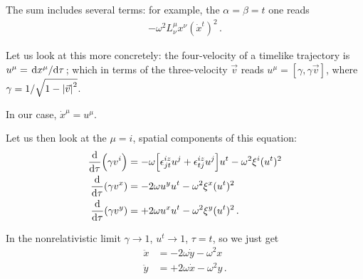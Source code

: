 \documentclass[main.tex]{subfiles}
\begin{document}
\begin{extracontent}
The sum includes several terms: for example, the \(\alpha = \beta = t\) one reads 
%
\begin{align}
- \omega^2 L^{\mu }_{\nu } x^{\nu } (\dot{x}^{t} )^2
\,.
\end{align}

Let us look at this more concretely: the four-velocity of a timelike trajectory is \(u^{\mu } = \dv*{x^{\mu }}{\tau }\); which in terms of the three-velocity \(\vec{v}\) reads \(u^{\mu } = [\gamma , \gamma \vec{v}]\), where \(\gamma = 1 / \sqrt{1 - \abs{\vec{v}}^2}\). 

In our case, \(\dot{x}^{\mu } = u^{\mu }\). 

Let us then look at the \(\mu = i\), spatial components of this equation: 
%
\begin{align}
\dv{}{\tau } \qty(\gamma v^{i}) &=
- \omega \qty[
    \epsilon^{iz}_{jt} u^{j}
    + \epsilon^{iz}_{tj} u^{j}
    ] u^{t} 
- \omega^2 \xi^{i}
(u^{t})^2  \\
\dv{}{\tau } \qty(\gamma v^{x} ) &= - 2\omega u^{y} u^{t} - \omega^2 \xi^{x} (u^{t})^2 \\
\dv{}{\tau } \qty(\gamma v^{y} ) &= + 2\omega u^{x} u^{t} - \omega^2 \xi^{y} (u^{t})^2 
\,.
\end{align}


In the nonrelativistic limit \(\gamma \to 1\), \(u^{t} \to 1\), \(\tau = t\), so we just get 
%
\begin{align}
\ddot{x} &= - 2 \omega \dot{y} - \omega^2 x  \\
\ddot{y} &= + 2 \omega \dot{x} - \omega^2 y   
\,.
\end{align}
\end{extracontent}
\end{document}
